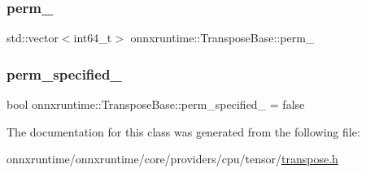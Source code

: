 \subsubsection{\texorpdfstring{perm\+\_\+}{perm\_}}
{\footnotesize\ttfamily std\+::vector$<$int64\+\_\+t$>$ onnxruntime\+::\+Transpose\+Base\+::perm\+\_\+\hspace{0.3cm}{\ttfamily [protected]}}

\mbox{\label{classonnxruntime_1_1TransposeBase_a61ce1837b9fb0de4811bd324f3d4c582}} 
\subsubsection{\texorpdfstring{perm\+\_\+specified\+\_\+}{perm\_specified\_}}
{\footnotesize\ttfamily bool onnxruntime\+::\+Transpose\+Base\+::perm\+\_\+specified\+\_\+ = false\hspace{0.3cm}{\ttfamily [protected]}}



The documentation for this class was generated from the following file\+:\begin{DoxyCompactItemize}
\item 
onnxruntime/onnxruntime/core/providers/cpu/tensor/\mbox{\hyperlink{cpu_2tensor_2transpose_8h}{transpose.\+h}}\end{DoxyCompactItemize}
